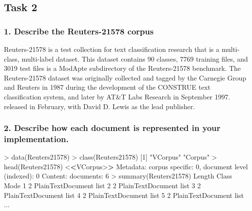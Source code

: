 \documentclass[
]{article}
\author{}
\date{}
\newenvironment{Shaded}{}{}
\newcommand{\DecValTok}[1]{\textcolor[rgb]{0.25,0.63,0.44}{#1}}
\newcommand{\ErrorTok}[1]{\textcolor[rgb]{1.00,0.00,0.00}{\textbf{#1}}}
\newcommand{\FunctionTok}[1]{\textcolor[rgb]{0.02,0.16,0.49}{#1}}
\newcommand{\NormalTok}[1]{#1}
\newcommand{\SpecialCharTok}[1]{\textcolor[rgb]{0.25,0.44,0.63}{#1}}
\newcommand{\StringTok}[1]{\textcolor[rgb]{0.25,0.44,0.63}{#1}}
\begin{document}
\hypertarget{header-n2}{%
\subsection{Task 2}\label{header-n2}}

\hypertarget{header-n3}{%
\subsubsection{1. Describe the Reuters-21578 corpus}\label{header-n3}}

Reuters-21578 is a test collection for text classification research that
is a multi-class, multi-label dataset. This dataset contains 90 classes,
7769 training files, and 3019 test files is a ModApte subdirectory of
the Reuters-21578 benchmark. The Reuters-21578 dataset was originally
collected and tagged by the Carnegie Group and Reuters in 1987 during
the development of the CONSTRUE text classification system, and later by
AT\&T Labs Research in September 1997. released in February, with David
D. Lewis as the lead publisher.

\hypertarget{header-n5}{%
\subsubsection{2. Describe how each document is represented in your
implementation.}\label{header-n5}}

\begin{Shaded}
\begin{Highlighting}[]
\SpecialCharTok{\textgreater{}} \FunctionTok{data}\NormalTok{(Reuters21578)}
\SpecialCharTok{\textgreater{}} \FunctionTok{class}\NormalTok{(Reuters21578)}
\NormalTok{[}\DecValTok{1}\NormalTok{] }\StringTok{"VCorpus"} \StringTok{"Corpus"} 
\SpecialCharTok{\textgreater{}} \FunctionTok{head}\NormalTok{(Reuters21578)}
\SpecialCharTok{\textless{}}\ErrorTok{\textless{}}\NormalTok{VCorpus}\SpecialCharTok{\textgreater{}}\ErrorTok{\textgreater{}}
\NormalTok{Metadata}\SpecialCharTok{:}\NormalTok{  corpus specific}\SpecialCharTok{:} \DecValTok{0}\NormalTok{, document }\FunctionTok{level}\NormalTok{ (indexed)}\SpecialCharTok{:} \DecValTok{0}
\NormalTok{Content}\SpecialCharTok{:}\NormalTok{  documents}\SpecialCharTok{:} \DecValTok{6}
\SpecialCharTok{\textgreater{}} \FunctionTok{summary}\NormalTok{(Reuters21578)}
\NormalTok{      Length Class             Mode}
\DecValTok{1}     \DecValTok{2}\NormalTok{      PlainTextDocument list}
\DecValTok{2}     \DecValTok{2}\NormalTok{      PlainTextDocument list}
\DecValTok{3}     \DecValTok{2}\NormalTok{      PlainTextDocument list}
\DecValTok{4}     \DecValTok{2}\NormalTok{      PlainTextDocument list}
\DecValTok{5}     \DecValTok{2}\NormalTok{      PlainTextDocument list}
\NormalTok{...}
\end{Highlighting}
\end{Shaded}
\end{document}
